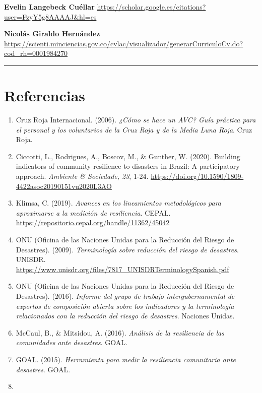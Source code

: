 \documentclass[
  letterpaper,
]{book}
\begin{document}
\textbf{Evelin Langebeck Cuéllar}
\url{https://scholar.google.es/citations?user=FzyY5g8AAAAJ&hl=es}

\textbf{Nicolás Giraldo Hernández}
\url{https://scienti.minciencias.gov.co/cvlac/visualizador/generarCurriculoCv.do?cod_rh=0001984270}

\begin{center}\rule{0.5\linewidth}{0.5pt}\end{center}


\chapter{Referencias}\label{referencias}

\begin{enumerate}
\def\labelenumi{\arabic{enumi}.}
\item
  Cruz Roja Internacional. (2006). \emph{¿Cómo se hace un AVC? Guía
  práctica para el personal y los voluntarios de la Cruz Roja y de la
  Media Luna Roja}. Cruz Roja.
\item
  Ciccotti, L., Rodrigues, A., Boscov, M., \& Gunther, W. (2020).
  Building indicators of community resilience to disasters in Brazil: A
  participatory approach. \emph{Ambiente \& Sociedade, 23}, 1-24.
  \url{https://doi.org/10.1590/1809-4422asoc20190151vu2020L3AO}
\item
  Klimsa, C. (2019). \emph{Avances en los lineamientos metodológicos
  para aproximarse a la medición de resiliencia}. CEPAL.
  \url{https://repositorio.cepal.org/handle/11362/45042}
\item
  ONU (Oficina de las Naciones Unidas para la Reducción del Riesgo de
  Desastres). (2009). \emph{Terminología sobre reducción del riesgo de
  desastres}. UNISDR.
  \url{https://www.unisdr.org/files/7817_UNISDRTerminologySpanish.pdf}
\item
  ONU (Oficina de las Naciones Unidas para la Reducción del Riesgo de
  Desastres). (2016). \emph{Informe del grupo de trabajo
  intergubernamental de expertos de composición abierta sobre los
  indicadores y la terminología relacionados con la reducción del riesgo
  de desastres}. Naciones Unidas.
\item
  McCaul, B., \& Mitsidou, A. (2016). \emph{Análisis de la resiliencia
  de las comunidades ante desastres}. GOAL.
\item
  GOAL. (2015). \emph{Herramienta para medir la resiliencia comunitaria
  ante desastres}. GOAL.
\item

\end{enumerate}
\end{document}
